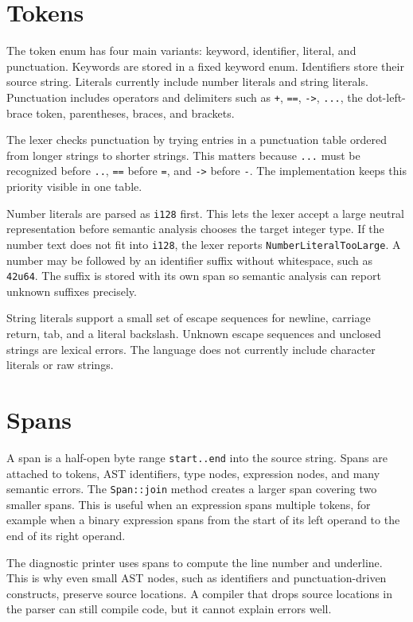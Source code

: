 \section{Tokens}

The token enum has four main variants: keyword, identifier, literal, and
punctuation. Keywords are stored in a fixed keyword enum. Identifiers store their
source string. Literals currently include number literals and string literals.
Punctuation includes operators and delimiters such as \texttt{+},
\texttt{==}, \texttt{->}, \texttt{...}, the dot-left-brace token, parentheses, braces, and
brackets.

The lexer checks punctuation by trying entries in a punctuation table ordered
from longer strings to shorter strings. This matters because \texttt{...} must
be recognized before \texttt{..}, \texttt{==} before \texttt{=}, and
\texttt{->} before \texttt{-}. The implementation keeps this priority visible in
one table.

Number literals are parsed as \texttt{i128} first. This lets the lexer accept a
large neutral representation before semantic analysis chooses the target integer
type. If the number text does not fit into \texttt{i128}, the lexer reports
\texttt{NumberLiteralTooLarge}. A number may be followed by an identifier suffix
without whitespace, such as \texttt{42u64}. The suffix is stored with its own
span so semantic analysis can report unknown suffixes precisely.

String literals support a small set of escape sequences for newline, carriage
return, tab, and a literal backslash. Unknown escape sequences and unclosed
strings are lexical errors. The language does not currently include character
literals or raw strings.

\section{Spans}

A span is a half-open byte range \texttt{start..end} into the source string.
Spans are attached to tokens, AST identifiers, type nodes, expression nodes, and
many semantic errors. The \texttt{Span::join} method creates a larger span
covering two smaller spans. This is useful when an expression spans multiple
tokens, for example when a binary expression spans from the start of its left
operand to the end of its right operand.

The diagnostic printer uses spans to compute the line number and underline. This
is why even small AST nodes, such as identifiers and punctuation-driven
constructs, preserve source locations. A compiler that drops source locations in
the parser can still compile code, but it cannot explain errors well.


